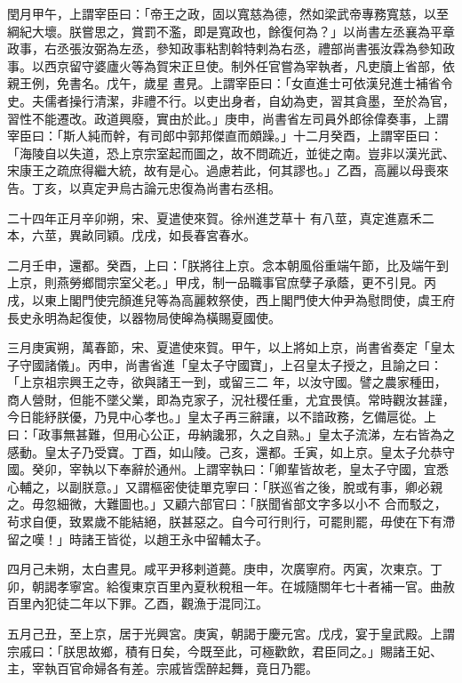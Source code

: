\begin{pinyinscope}
 閏月甲午，上謂宰臣曰：「帝王之政，固以寬慈為德，然如梁武帝專務寬慈，以至綱紀大壞。朕嘗思之，賞罰不濫，即是寬政也，餘復何為？」以尚書左丞襄為平章政事，右丞張汝弼為左丞，參知政事粘割斡特剌為右丞，禮部尚書張汝霖為參知政事。以西京留守婆廬火等為賀宋正旦使。制外任官嘗為宰執者，凡吏牘上省部，依親王例，免書名。戊午，歲星
 晝見。上謂宰臣曰：「女直進士可依漢兒進士補省令史。夫儒者操行清潔，非禮不行。以吏出身者，自幼為吏，習其貪墨，至於為官，習性不能遷改。政道興廢，實由於此。」庚申，尚書省左司員外郎徐偉奏事，上謂宰臣曰：「斯人純而幹，有司郎中郭邦傑直而頗躁。」十二月癸酉，上謂宰臣曰：「海陵自以失道，恐上京宗室起而圖之，故不問疏近，並徙之南。豈非以漢光武、宋康王之疏庶得繼大統，故有是心。過慮若此，何其謬也。」乙酉，高麗以母喪來告。丁亥，以真定尹烏古論元忠復為尚書右丞相。



 二十四年正月辛卯朔，宋、夏遣使來賀。徐州進芝草十
 有八莖，真定進嘉禾二本，六莖，異畝同穎。戊戌，如長春宮春水。



 二月壬申，還都。癸酉，上曰：「朕將往上京。念本朝風俗重端午節，比及端午到上京，則燕勞鄉間宗室父老。」甲戌，制一品職事官庶孽子承蔭，更不引見。丙戌，以東上閣門使完顏進兒等為高麗敕祭使，西上閣門使大仲尹為慰問使，虞王府長史永明為起復使，以器物局使皞為橫賜夏國使。



 三月庚寅朔，萬春節，宋、夏遣使來賀。甲午，以上將如上京，尚書省奏定「皇太子守國諸儀」。丙申，尚書省進「皇太子守國寶」，上召皇太子授之，且諭之曰：「上京祖宗興王之寺，欲與諸王一到，或留三二
 年，以汝守國。譬之農家種田，商人營財，但能不墜父業，即為克家子，況社稷任重，尤宜畏慎。常時觀汝甚謹，今日能紓朕優，乃見中心孝也。」皇太子再三辭讓，以不諳政務，乞備扈從。上曰：「政事無甚難，但用心公正，毋納讒邪，久之自熟。」皇太子流涕，左右皆為之感動。皇太子乃受寶。丁酉，如山陵。己亥，還都。壬寅，如上京。皇太子允恭守國。癸卯，宰執以下奉辭於通州。上謂宰執曰：「卿輩皆故老，皇太子守國，宜悉心輔之，以副朕意。」又謂樞密使徒單克寧曰：「朕巡省之後，脫或有事，卿必親之。毋忽細微，大難圖也。」又顧六部官曰：「朕聞省部文字多以小不
 合而駁之，茍求自便，致累歲不能結絕，朕甚惡之。自今可行則行，可罷則罷，毋使在下有滯留之嘆！」時諸王皆從，以趙王永中留輔太子。



 四月己未朔，太白晝見。咸平尹移剌道薨。庚申，次廣寧府。丙寅，次東京。丁卯，朝謁孝寧宮。給復東京百里內夏秋稅租一年。在城隨關年七十者補一官。曲赦百里內犯徒二年以下罪。乙酉，觀漁于混同江。



 五月己丑，至上京，居于光興宮。庚寅，朝謁于慶元宮。戊戌，宴于皇武殿。上謂宗戚曰：「朕思故鄉，積有日矣，今既至此，可極歡飲，君臣同之。」賜諸王妃、主，宰執百官命婦各有差。宗戚皆霑醉起舞，竟日乃罷。




\end{pinyinscope}

